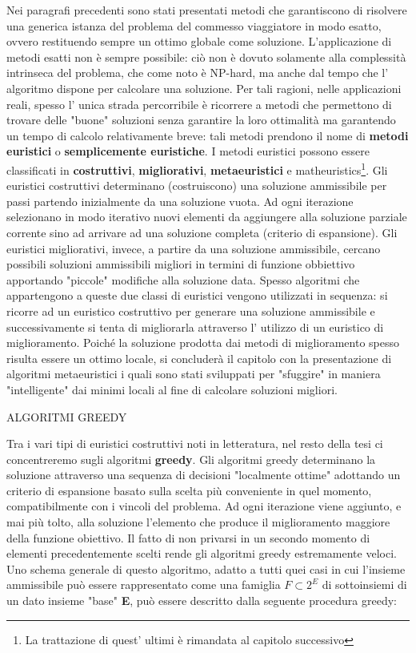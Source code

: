 \documentclass[11pt]{article}
\begin{document}
Nei paragrafi precedenti sono stati presentati metodi che garantiscono di risolvere una generica istanza del problema del commesso viaggiatore in modo esatto, ovvero restituendo sempre un ottimo globale come soluzione.
L'applicazione di metodi esatti non è sempre possibile: ciò non è dovuto solamente alla complessità intrinseca del problema, che come noto è NP-hard, ma anche dal tempo che l' algoritmo dispone per calcolare una soluzione. 
Per tali ragioni, nelle applicazioni reali, spesso l' unica strada percorribile è ricorrere a metodi che permettono di trovare delle "buone" soluzioni senza garantire la loro ottimalità ma garantendo un tempo di calcolo relativamente breve: tali metodi prendono il nome di \textbf{metodi euristici} o \textbf{semplicemente euristiche}. I metodi euristici possono essere classificati in \textbf{costruttivi}, \textbf{migliorativi}, \textbf{metaeuristici} e matheuristics\footnote{La trattazione di quest' ultimi è rimandata al capitolo successivo}. 
Gli euristici costruttivi determinano (costruiscono) una soluzione ammissibile per passi partendo inizialmente da una soluzione vuota. Ad ogni iterazione selezionano in modo iterativo nuovi elementi da aggiungere alla soluzione parziale corrente sino ad arrivare ad una soluzione completa (criterio di espansione). Gli euristici migliorativi, invece, a partire da una soluzione ammissibile, cercano possibili soluzioni ammissibili migliori in termini di funzione obbiettivo apportando "piccole" modifiche alla soluzione data.
Spesso algoritmi che appartengono a queste due classi di euristici vengono utilizzati in sequenza: si ricorre ad un euristico costruttivo per generare una soluzione ammissibile e successivamente si tenta di migliorarla attraverso l' utilizzo di un euristico di miglioramento. 
Poiché la soluzione prodotta dai metodi di miglioramento spesso risulta essere un ottimo locale, si concluderà il capitolo con la presentazione di algoritmi metaeuristici i quali sono stati sviluppati per "sfuggire" in maniera "intelligente" dai minimi locali al fine di calcolare soluzioni migliori.

\vspace{2\baselineskip}
ALGORITMI GREEDY
\vspace{2\baselineskip}

Tra i vari tipi di euristici costruttivi noti in letteratura, nel resto della tesi ci concentreremo sugli algoritmi \textbf{greedy}.  
Gli algoritmi greedy determinano la soluzione attraverso una sequenza di decisioni "localmente ottime" adottando un criterio di espansione basato sulla scelta più conveniente in quel momento, compatibilmente con i vincoli del problema. Ad ogni iterazione viene aggiunto, e mai più tolto, alla soluzione l'elemento che produce il miglioramento maggiore della funzione obiettivo. Il fatto di non privarsi in un secondo momento di elementi precedentemente scelti rende gli algoritmi greedy estremamente veloci.
Uno schema generale di questo algoritmo, adatto a tutti quei casi in cui l'insieme ammissibile può essere rappresentato come una famiglia $ F \subset 2^E$ di sottoinsiemi di un dato insieme "base" \textbf{E}, può essere descritto dalla seguente procedura greedy:
\end{document}
